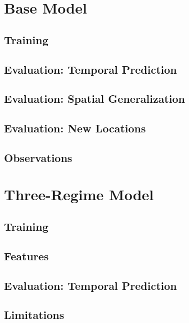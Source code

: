 \documentclass[11pt]{article}
\begin{document}
\newpage


\section{Base Model}

\subsection{Training}


\subsection{Evaluation: Temporal Prediction}


\subsection{Evaluation: Spatial Generalization}


\subsection{Evaluation: New Locations}


\subsection{Observations}


\newpage


\section{Three-Regime Model}

\subsection{Training}


\subsection{Features}


\subsection{Evaluation: Temporal Prediction}


\subsection{Limitations}




\end{document}
